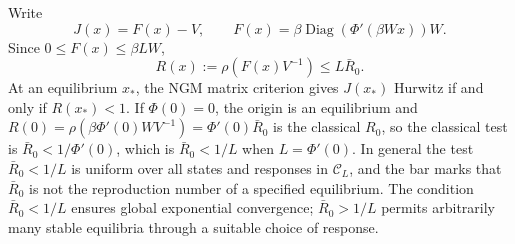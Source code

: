 Write
\[
 J(x)=F(x)-V,\qquad
 F(x)=\beta\operatorname{Diag}(\Phi'(\beta Wx))W.
\]
Since $0\le F(x)\le\beta LW$,
\[
 R(x):=\rho(F(x)V^{-1})\le L\bar R_0.
\]
At an equilibrium $x_*$, the NGM matrix criterion gives
$J(x_*)$ Hurwitz if and only if $R(x_*)<1$. If $\Phi(0)=0$, the origin is an equilibrium and
$R(0)=\rho(\beta\Phi'(0)WV^{-1})=\Phi'(0)\bar R_0$ is the classical $R_0$, so the classical test is $\bar R_0<1/\Phi'(0)$, which is $\bar R_0<1/L$ when $L=\Phi'(0)$.
In general the test $\bar R_0<1/L$ is uniform over all states and
responses in $\mathcal C_L$, and the bar marks that $\bar R_0$ is not the reproduction number
of a specified equilibrium. The condition $\bar R_0<1/L$ ensures global
exponential convergence; $\bar R_0>1/L$ permits arbitrarily many stable
equilibria through a suitable choice of response.
\eeR

